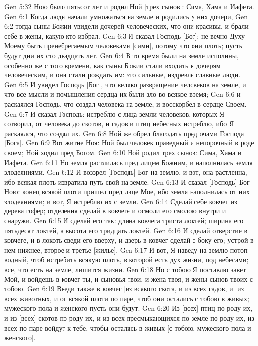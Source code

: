 \rsbpar\vs Gen 5:32 Ною было пятьсот лет и родил Ной [трех сынов]: Сима, Хама и Иафета.
\vs Gen 6:1 Когда люди начали умножаться на земле и родились у них дочери,
\vs Gen 6:2 тогда сыны Божии увидели дочерей человеческих, что они красивы, и брали  себе в жены, какую кто избрал.
\vs Gen 6:3 И сказал Господь [Бог]: не вечно Духу Моему быть пренебрегаемым человеками [сими], потому что они плоть; пусть будут дни их сто двадцать лет.
\vs Gen 6:4 В то время были на земле исполины, особенно же с того времени, как сыны Божии стали входить к дочерям человеческим, и они стали рождать им: это сильные, издревле славные люди.
\rsbpar\vs Gen 6:5 И увидел Господь [Бог], что велико развращение человеков на земле, и что все мысли и помышления сердца их были зло во всякое время;
\vs Gen 6:6 и раскаялся Господь, что создал человека на земле, и восскорбел в сердце Своем.
\vs Gen 6:7 И сказал Господь: истреблю с лица земли человеков, которых Я сотворил, от человека до скотов, и гадов и птиц небесных истреблю, ибо Я раскаялся, что создал их.
\rsbpar\vs Gen 6:8 Ной же обрел благодать пред очами Господа [Бога].
\rsbpar\vs Gen 6:9 Вот житие Ноя: Ной был человек праведный и непорочный в роде своем; Ной ходил пред Богом.
\vs Gen 6:10 Ной родил трех сынов: Сима, Хама и Иафета.
\vs Gen 6:11 Но земля растлилась пред лицем Божиим, и наполнилась земля злодеяниями.
\vs Gen 6:12 И воззрел [Господь] Бог на землю, и вот, она растленна, ибо всякая плоть извратила путь свой на земле.
\vs Gen 6:13 И сказал [Господь] Бог Ною: конец всякой плоти пришел пред лице Мое, ибо земля наполнилась от них злодеяниями; и вот, Я истреблю их с земли.
\vs Gen 6:14 Сделай себе ковчег из дерева гофер; отделения сделай в ковчеге и осмоли его смолою внутри и снаружи.
\vs Gen 6:15 И сделай его так: длина ковчега триста локтей; ширина его пятьдесят локтей, а высота его тридцать локтей.
\vs Gen 6:16 И сделай отверстие в ковчеге, и в локоть сведи его вверху, и дверь в ковчег сделай с боку его; устрой в нем нижнее, второе и третье [жилье].
\vs Gen 6:17 И вот, Я наведу на землю потоп водный, чтоб истребить всякую плоть, в которой есть дух жизни, под небесами; все, что есть на земле, лишится жизни.
\vs Gen 6:18 Но с тобою Я поставлю завет Мой, и войдешь в ковчег ты, и сыновья твои, и жена твоя, и жены сынов твоих с тобою.
\vs Gen 6:19 Введи также в ковчег [из всякого скота, и из всех гадов, и] из всех животных, и от всякой плоти по паре, чтоб они остались с тобою в живых; мужеского пола и женского пусть они будут.
\vs Gen 6:20 Из [всех] птиц по роду их, и из [всех] скотов по роду их, и из всех пресмыкающихся по земле по роду их, из всех по паре войдут к тебе, чтобы остались в живых [с тобою, мужеского пола и женского].
